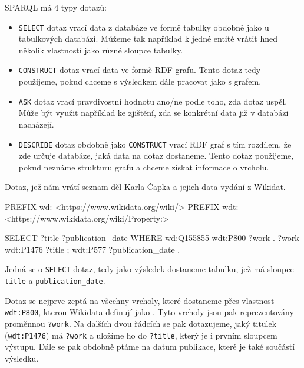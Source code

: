 SPARQL má 4 typy dotazů:
\begin{itemize}
    \item \texttt{SELECT} dotaz vrací data z databáze ve formě tabulky obdobně jako u tabulkových databází. Můžeme tak například k jedné entitě vrátit hned několik vlastností jako různé sloupce tabulky.
    \item \texttt{CONSTRUCT} dotaz vrací data ve formě RDF grafu. Tento dotaz tedy použijeme, pokud chceme s výsledkem dále pracovat jako s grafem.
    \item \texttt{ASK} dotaz vrací pravdivostní hodnotu ano/ne podle toho, zda dotaz uspěl. Může být využit například ke zjištění, zda se konkrétní data již v databázi nacházejí.
    \item \texttt{DESCRIBE} dotaz obdobně jako \texttt{CONSTRUCT} vrací RDF graf s tím rozdílem, že zde určuje databáze, jaká data na dotaz dostaneme. Tento dotaz použijeme, pokud neznáme strukturu grafu a chceme získat  informace o vrcholu.
\end{itemize}

\newpage

\begin{prikl}
Dotaz, jež nám vrátí seznam děl Karla Čapka a jejich data vydání z Wikidat.
\begin{code}
PREFIX wd: <https://www.wikidata.org/wiki/>
PREFIX wdt: <https://www.wikidata.org/wiki/Property:>

SELECT ?title ?publication_date
WHERE
{
    wd:Q155855 wdt:P800 ?work .
    ?work wdt:P1476 ?title ;
          wdt:P577 ?publication_date .
}
\end{code}
Jedná se o \texttt{SELECT} dotaz, tedy jako výsledek dostaneme tabulku, jež má sloupce \texttt{title} a \texttt{publication_date}.

Dotaz se nejprve zeptá na všechny vrcholy, které dostaneme přes vlastnost \texttt{wdt:P800}, kterou Wikidata definují jako . Tyto vrcholy jsou pak reprezentovány proměnnou \texttt{?work}. Na dalších dvou řádcích se pak dotazujeme, jaký titulek (\texttt{wdt:P1476}) má \texttt{?work} a uložíme ho do \texttt{?title}, který je i prvním sloupcem výstupu. Dále se pak obdobně ptáme na datum publikace, které je také součástí výsledku.
\end{prikl}